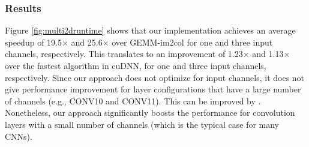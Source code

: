 \subsubsection{Results} Figure \ref{fig:multi2druntime} shows that our
implementation achieves an average speedup of 19.5$\times$ and 25.6$\times$ over GEMM-im2col for one and three input channels,
respectively. This translates to an improvement of 1.23$\times$ and 1.13$\times$ over the fastest algorithm in cuDNN, for one and three
input channels, respectively. Since our approach does not optimize for input channels, it does not give performance improvement for layer
configurations that have a large number of channels (e.g., CONV10 and CONV11). This can be improved by . Nonetheless, our approach significantly boosts the performance for convolution layers with a small number of channels (which is the
typical case for many CNNs).
